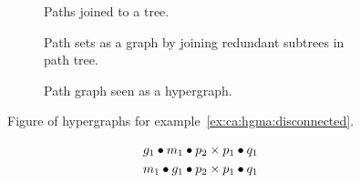 \documentclass[../Master.tex]{subfiles}
\begin{document}
\begin{figure}
    \centering
    \begin{subfigure}[t]{0.30\textwidth}
        \centering
        \raisebox{-0.5\height}{\resizebox{\linewidth}{!}{}}
        \caption{Paths joined to a tree.}
        \label{fig:ca:graphExTree}
    \end{subfigure}%
    \hfill%
    \begin{subfigure}[t]{0.30\textwidth}
        \centering
        \resizebox{1\linewidth}{!}{\raisebox{-0.5\height}{}}
        \caption{Path sets as a graph by joining redundant subtrees in path tree.}
        \label{fig:ca:graphExGraph}
    \end{subfigure}
    \hfill%
    \begin{subfigure}[t]{0.30\textwidth}
        \centering
        \resizebox{1\linewidth}{!}{\raisebox{-0.5\height}{}}
        \caption{Path graph seen as a hypergraph.}
        \label{fig:ca:graphExHG}
    \end{subfigure}
    \caption{Figure of hypergraphs for example~\ref{ex:ca:hgma:disconnected}.}\label{fig:ex:ca:hgma:ex:disconnected}
\end{figure}

\begin{example}
    \begin{align*}
        & g_1 \bullet m_1 \bullet p_2 \times p_1 \bullet q_1 \\
        & m_1 \bullet g_1 \bullet p_2 \times p_1 \bullet q_1
    \end{align*}
\end{example}

%
%
%
\end{document}
